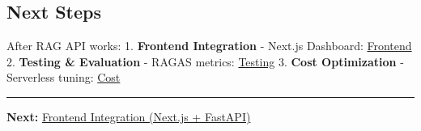 \hypertarget{next-steps}{%
\subsection{Next Steps}}

After RAG API works: 1. \textbf{Frontend Integration} - Next.js
Dashboard: \href{5.14-Frontend/}{Frontend} 2. \textbf{Testing \&
Evaluation} - RAGAS metrics: \href{5.15-Testing/}{Testing} 3.
\textbf{Cost Optimization} - Serverless tuning: \href{5.16-Cost/}{Cost}

\begin{center}\rule{0.5\linewidth}{0.5pt}\end{center}

\textbf{Next:} \href{5.14-Frontend/}{Frontend Integration (Next.js +
FastAPI)}
